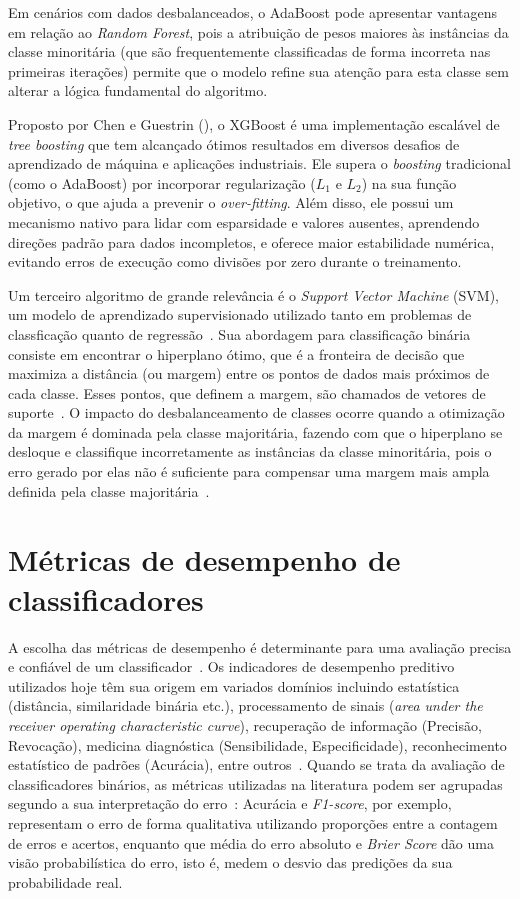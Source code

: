Em cenários com dados desbalanceados, o AdaBoost pode apresentar vantagens em relação ao \textit{Random Forest}, pois a atribuição de pesos maiores às instâncias da classe minoritária (que são frequentemente classificadas de forma incorreta nas primeiras iterações) permite que o modelo refine sua atenção para esta classe sem alterar a lógica fundamental do algoritmo.

Proposto por Chen e Guestrin (\citeyear{Chen2016}), o XGBoost é uma implementação escalável de \textit{tree boosting} que tem alcançado ótimos resultados em diversos desafios de aprendizado de máquina e aplicações industriais. Ele supera o \textit{boosting} tradicional (como o AdaBoost) por incorporar regularização (\(L_1\) e \(L_2\)) na sua função objetivo, o que ajuda a prevenir o \textit{over-fitting}. Além disso, ele possui um mecanismo nativo para lidar com esparsidade e valores ausentes, aprendendo direções padrão para dados incompletos, e oferece maior estabilidade numérica, evitando erros de execução como divisões por zero durante o treinamento.

Um terceiro algoritmo de grande relevância é o \textit{Support Vector Machine} (SVM), um modelo de aprendizado supervisionado utilizado tanto em problemas de classficação quanto de regressão~\cite{Farquad2012}. Sua abordagem para classificação binária consiste em encontrar o hiperplano ótimo, que é a fronteira de decisão que maximiza a distância (ou margem) entre os pontos de dados mais próximos de cada classe. Esses pontos, que definem a margem, são chamados de vetores de suporte~\cite{Vapnik2013}. O impacto do desbalanceamento de classes ocorre quando a otimização da margem é dominada pela classe majoritária, fazendo com que o hiperplano se desloque e classifique incorretamente as instâncias da classe minoritária, pois o erro gerado por elas não é suficiente para compensar uma margem mais ampla definida pela classe majoritária~\cite{Daskalaki2006}.

\section{Métricas de desempenho de classificadores}

A escolha das métricas de desempenho é determinante para uma avaliação precisa e confiável de um classificador~\cite{Gaudreault2021}. Os indicadores de desempenho preditivo utilizados hoje têm sua origem em variados domínios incluindo estatística (distância, similaridade binária etc.), processamento de sinais (\textit{area under the receiver operating characteristic curve}), recuperação de informação (Precisão, Revocação), medicina diagnóstica (Sensibilidade, Especificidade), reconhecimento estatístico de padrões (Acurácia), entre outros~\cite{Canbek2023}. Quando se trata da avaliação de classificadores binários, as métricas utilizadas na literatura podem ser agrupadas segundo a sua interpretação do erro~\cite{Ferri2009}:  Acurácia e \textit{F1-score}, por exemplo, representam o erro de forma qualitativa utilizando proporções entre a contagem de erros e acertos, enquanto que média do erro absoluto e \textit{Brier Score} dão uma visão probabilística do erro, isto é, medem o desvio das predições da sua probabilidade real.

